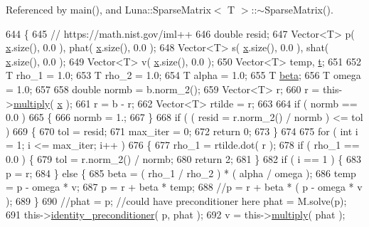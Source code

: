 Referenced by main(), and Luna\+::\+Sparse\+Matrix$<$ T $>$\+::$\sim$\+Sparse\+Matrix().


\begin{DoxyCode}
644   \{
645     \textcolor{comment}{// https://math.nist.gov/iml++}
646     \textcolor{keywordtype}{double} resid;
647     Vector<T> p( \hyperlink{namespaceHeat__plot_aa88370c16b85b784ccbde3ed88bc1991}{x}.size(), 0.0 ), phat( \hyperlink{namespaceHeat__plot_aa88370c16b85b784ccbde3ed88bc1991}{x}.size(), 0.0 );
648     Vector<T> s( \hyperlink{namespaceHeat__plot_aa88370c16b85b784ccbde3ed88bc1991}{x}.size(), 0.0 ), shat( \hyperlink{namespaceHeat__plot_aa88370c16b85b784ccbde3ed88bc1991}{x}.size(), 0.0 );
649     Vector<T> v( \hyperlink{namespaceHeat__plot_aa88370c16b85b784ccbde3ed88bc1991}{x}.size(), 0.0 );
650     Vector<T> temp, \hyperlink{namespaceHeat__plot_a25a93a2226128530145cc611f350163b}{t};
651 
652     T rho\_1 = 1.0;
653     T rho\_2 = 1.0;
654     T alpha = 1.0;
655     T \hyperlink{namespaceLuna_af542f1c7522ca96017105e160b54df80}{beta};
656     T omega = 1.0;
657 
658     \textcolor{keywordtype}{double} normb = b.norm\_2();
659     Vector<T> r;
660     r = this->\hyperlink{classLuna_1_1SparseMatrix_a532c8a8b80b0accf950a642344e7954f}{multiply}( \hyperlink{namespaceHeat__plot_aa88370c16b85b784ccbde3ed88bc1991}{x} );
661     r = b - r;
662     Vector<T> rtilde = r;
663 
664     \textcolor{keywordflow}{if} ( normb == 0.0 )
665     \{
666       normb = 1.;
667     \}
668     \textcolor{keywordflow}{if} ( ( resid = r.norm\_2() / normb ) <= tol )
669     \{
670       tol = resid;
671       max\_iter = 0;
672       \textcolor{keywordflow}{return} 0;
673     \}
674 
675     \textcolor{keywordflow}{for} ( \textcolor{keywordtype}{int} i = 1; i <= max\_iter; i++ )
676     \{
677       rho\_1 = rtilde.dot( r );
678       \textcolor{keywordflow}{if} ( rho\_1 == 0.0 ) \{
679         tol = r.norm\_2() / normb;
680         \textcolor{keywordflow}{return} 2;
681       \}
682       \textcolor{keywordflow}{if} ( i == 1 ) \{
683         p = r;
684       \} \textcolor{keywordflow}{else} \{
685         beta = ( rho\_1 / rho\_2 ) * ( alpha / omega );
686         temp = p - omega * v;
687         p = r + beta * temp;
688         \textcolor{comment}{//p = r + beta * ( p - omega * v );}
689       \}
690       \textcolor{comment}{//phat = p; //could have preconditioner here phat = M.solve(p);}
691       this->\hyperlink{classLuna_1_1SparseMatrix_ac196d00210b58f3f62352054f4241411}{identity\_preconditioner}( p, phat );
692       v = this->\hyperlink{classLuna_1_1SparseMatrix_a532c8a8b80b0accf950a642344e7954f}{multiply}( phat );

\end{DoxyCode}
